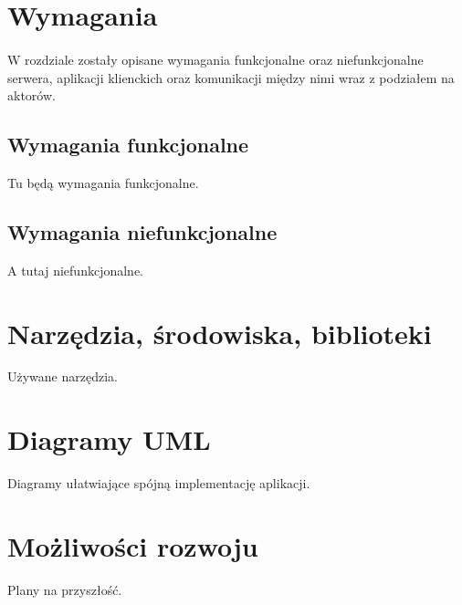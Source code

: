 \documentclass{article}
\begin{document}



    \section{Wymagania}
    \paragraph{}W rozdziale zostały opisane wymagania funkcjonalne oraz niefunkcjonalne serwera, aplikacji klienckich oraz komunikacji między nimi wraz z podziałem na aktorów.

    \subsection{Wymagania funkcjonalne}
    Tu będą wymagania funkcjonalne.

    \subsection{Wymagania niefunkcjonalne}
    A tutaj niefunkcjonalne.

    \section{Narzędzia, środowiska, biblioteki}
    Używane narzędzia.

    \section{Diagramy UML}
    Diagramy ułatwiające spójną implementację aplikacji.

    \section{Możliwości rozwoju}
    Plany na przyszłość.
\end{document}
